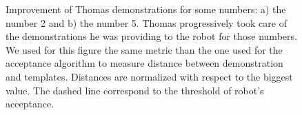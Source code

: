 \documentclass[10pt,a4paper]{article}
\begin{document}
\begin{figure}[!]
    \centering
    \caption{\small Improvement of Thomas demonstrations for some numbers: a) the number 2 and b) the number 5. Thomas progressively took care of the demonstrations he was providing to the robot for those numbers. We used for this figure the same metric than the one used for the acceptance algorithm to measure distance between demonstration and templates. Distances are normalized with respect to the biggest value. The dashed line correspond to the threshold of robot's acceptance.}
    \label{Thomas_progress}
\end{figure}
\end{document}
